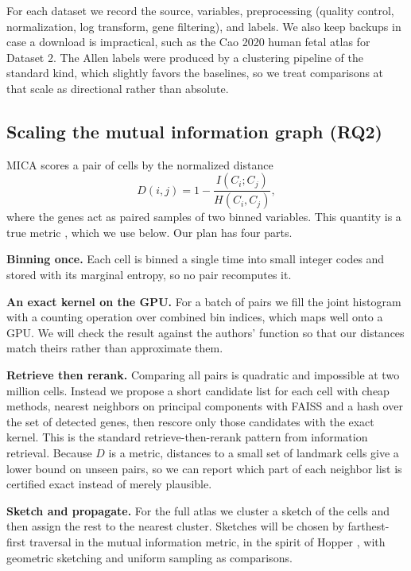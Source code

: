 For each dataset we record the source, variables, preprocessing (quality control, normalization, log transform, gene filtering), and labels. We also keep backups in case a download is impractical, such as the Cao 2020 human fetal atlas for Dataset 2. The Allen labels were produced by a clustering pipeline of the standard kind, which slightly favors the baselines, so we treat comparisons at that scale as directional rather than absolute.

\subsection{Scaling the mutual information graph (RQ2)}
MICA scores a pair of cells by the normalized distance
\begin{equation}
D(i,j) = 1 - \frac{I(C_i; C_j)}{H(C_i, C_j)},
\end{equation}
where the genes act as paired samples of two binned variables. This quantity is a true metric \cite{vinh2010information}, which we use below. Our plan has four parts.

\textbf{Binning once.} Each cell is binned a single time into small integer codes and stored with its marginal entropy, so no pair recomputes it.

\textbf{An exact kernel on the GPU.} For a batch of pairs we fill the joint histogram with a counting operation over combined bin indices, which maps well onto a GPU. We will check the result against the authors' function so that our distances match theirs rather than approximate them.

\textbf{Retrieve then rerank.} Comparing all pairs is quadratic and impossible at two million cells. Instead we propose a short candidate list for each cell with cheap methods, nearest neighbors on principal components with FAISS \cite{douze2024faiss} and a hash over the set of detected genes, then rescore only those candidates with the exact kernel. This is the standard retrieve-then-rerank pattern from information retrieval. Because $D$ is a metric, distances to a small set of landmark cells give a lower bound on unseen pairs, so we can report which part of each neighbor list is certified exact instead of merely plausible.

\textbf{Sketch and propagate.} For the full atlas we cluster a sketch of the cells and then assign the rest to the nearest cluster. Sketches will be chosen by farthest-first traversal in the mutual information metric, in the spirit of Hopper \cite{demeo2020hopper}, with geometric sketching \cite{hie2019geosketch} and uniform sampling as comparisons.

